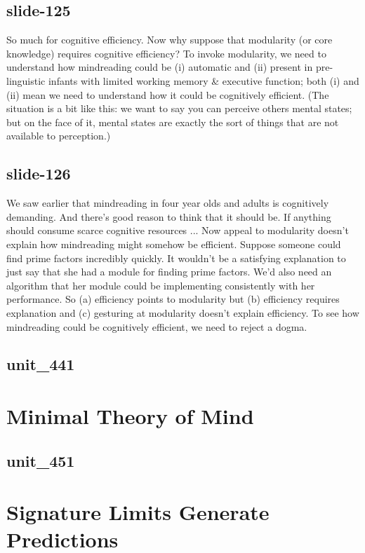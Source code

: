 \documentclass[12pt,\papersize]{extarticle}
\begin{document}
 
\subsection{slide-125}
So much for cognitive efficiency.
Now why suppose that modularity (or core knowledge) requires cognitive efficiency?
To invoke modularity, we need to understand how mindreading could be (i) automatic and (ii) present in pre-linguistic infants with limited working memory \& executive function; both (i) and (ii) mean we need to understand how it could be cognitively efficient. (The situation is a bit like this: we want to say you can perceive others mental states; but on the face of it, mental states are exactly the sort of things that are not available to perception.)
 
 
\subsection{slide-126}
We saw earlier that mindreading in four year olds and adults is cognitively demanding.
And there's good reason to think that it should be.
If anything should consume scarce cognitive resources ...
Now appeal to modularity doesn't explain how mindreading might somehow be efficient.
Suppose someone could find prime factors incredibly quickly.
It wouldn't be a satisfying explanation to just say that she had a module for finding prime factors.
We'd also need an algorithm that her module could be implementing consistently with her performance.
So (a) efficiency points to modularity but (b) efficiency requires explanation and (c) gesturing at modularity doesn't explain efficiency.
To see how mindreading could be cognitively efficient, we need to reject a dogma.
 
 
\subsection{unit\_441}
 
\section{Minimal Theory of Mind}
 
 
\subsection{unit\_451}
 
\section{Signature Limits Generate Predictions}
 
\end{document}
